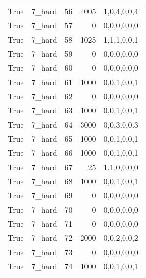 \begin{tabular}{llrrl}
 True            & 7\_hard              &            56 &                  4005 & 1,0,4,0,0,4   \\
 True            & 7\_hard              &            57 &                     0 & 0,0,0,0,0,0   \\
 True            & 7\_hard              &            58 &                  1025 & 1,1,1,0,0,1   \\
 True            & 7\_hard              &            59 &                     0 & 0,0,0,0,0,0   \\
 True            & 7\_hard              &            60 &                     0 & 0,0,0,0,0,0   \\
 True            & 7\_hard              &            61 &                  1000 & 0,0,1,0,0,1   \\
 True            & 7\_hard              &            62 &                     0 & 0,0,0,0,0,0   \\
 True            & 7\_hard              &            63 &                  1000 & 0,0,1,0,0,1   \\
 True            & 7\_hard              &            64 &                  3000 & 0,0,3,0,0,3   \\
 True            & 7\_hard              &            65 &                  1000 & 0,0,1,0,0,1   \\
 True            & 7\_hard              &            66 &                  1000 & 0,0,1,0,0,1   \\
 True            & 7\_hard              &            67 &                    25 & 1,1,0,0,0,0   \\
 True            & 7\_hard              &            68 &                  1000 & 0,0,1,0,0,1   \\
 True            & 7\_hard              &            69 &                     0 & 0,0,0,0,0,0   \\
 True            & 7\_hard              &            70 &                     0 & 0,0,0,0,0,0   \\
 True            & 7\_hard              &            71 &                     0 & 0,0,0,0,0,0   \\
 True            & 7\_hard              &            72 &                  2000 & 0,0,2,0,0,2   \\
 True            & 7\_hard              &            73 &                     0 & 0,0,0,0,0,0   \\
 True            & 7\_hard              &            74 &                  1000 & 0,0,1,0,0,1   \\

\end{tabular}
